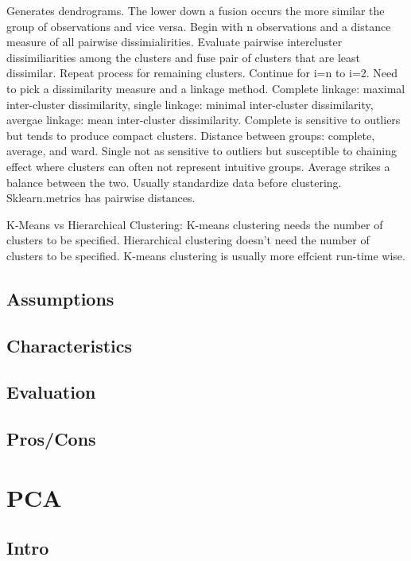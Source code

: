 \documentclass[]{book}
\theoremstyle{definition}
\theoremstyle{definition}
\theoremstyle{definition}
\theoremstyle{remark}
\begin{document}
Generates dendrograms. The lower down a fusion occurs the more similar
the group of observations and vice versa. Begin with n observations and
a distance measure of all pairwise dissimialirities. Evaluate pairwise
intercluster dissimiliarities among the clusters and fuse pair of
clusters that are least dissimilar. Repeat process for remaining
clusters. Continue for i=n to i=2. Need to pick a dissimilarity measure
and a linkage method. Complete linkage: maximal inter-cluster
dissimilarity, single linkage: minimal inter-cluster dissimilarity,
avergae linkage: mean inter-cluster dissimilarity. Complete is sensitive
to outliers but tends to produce compact clusters. Distance between
groups: complete, average, and ward. Single not as sensitive to outliers
but susceptible to chaining effect where clusters can often not
represent intuitive groups. Average strikes a balance between the two.
Usually standardize data before clustering. Sklearn.metrics has pairwise
distances.

K-Means vs Hierarchical Clustering: K-means clustering needs the number
of clusters to be speciﬁed. Hierarchical clustering doesn't need the
number of clusters to be speciﬁed. K-means clustering is usually more
effcient run-time wise.

\subsection{Assumptions}\label{assumptions-6}

\subsection{Characteristics}\label{characteristics-1}

\subsection{Evaluation}\label{evaluation-5}

\subsection{Pros/Cons}\label{proscons-6}

\section{PCA}\label{pca}

\subsection{Intro}\label{intro-7}
\end{document}
